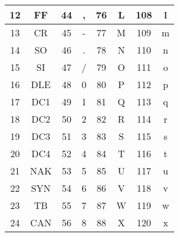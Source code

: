 \begin{longtable}{|c|c|c|c|c|c|c|c|}
	\hline
	12             & FF            & 44             & ,             & 76             & L                      & 108            & l                      \\
	\hline
	13             & CR            & 45             & -             & 77             & M                      & 109            & m                      \\
	\hline
	14             & SO            & 46             & .             & 78             & N                      & 110            & n                      \\
	\hline
	15             & SI            & 47             & /             & 79             & O                      & 111            & o                      \\
	\hline
	16             & DLE           & 48             & 0             & 80             & P                      & 112            & p                      \\
	\hline
	17             & DC1           & 49             & 1             & 81             & Q                      & 113            & q                      \\
	\hline
	18             & DC2           & 50             & 2             & 82             & R                      & 114            & r                      \\
	\hline
	19             & DC3           & 51             & 3             & 83             & S                      & 115            & s                      \\
	\hline
	20             & DC4           & 52             & 4             & 84             & T                      & 116            & t                      \\
	\hline
	21             & NAK           & 53             & 5             & 85             & U                      & 117            & u                      \\
	\hline
	22             & SYN           & 54             & 6             & 86             & V                      & 118            & v                      \\
	\hline
	23             & TB            & 55             & 7             & 87             & W                      & 119            & w                      \\
	\hline
	24             & CAN           & 56             & 8             & 88             & X                      & 120            & x                      \\

\end{longtable}
